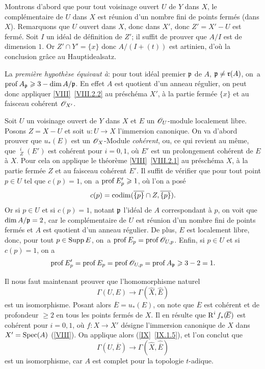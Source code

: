 Montrons d'abord que pour tout voisinage ouvert $U$ de $Y$ dans $X$, le compl\'ementaire de $U$ dans $X$ est r\'eunion d'un nombre fini de points ferm\'es (dans $X$). Remarquons que $U$ ouvert dans $X$, donc dans $X'$, donc $Z'=X'-U$ est ferm\'e. Soit $I$ un id\'eal de d\'efinition de $Z'$; il suffit de prouver que $A/I$ est de dimension $1$. Or $Z'\cap Y'=\{x\}$ donc $A/(I+(t))$ est artinien, d'o\`u la conclusion gr\^ace au \og Hauptidealsatz\fg.

La \emph{première hypothèse équivaut à}: \og pour tout id\'eal premier $\mathfrak{p}$ de $A$, $\mathfrak{p}\neq \mathfrak{r}(A)$, on~a $\operatorname{prof} A_{\mathfrak{p}}\geqslant3-\dim A/\mathfrak{p}$\fg. En effet $A$ est quotient d'un anneau r\'egulier, on peut donc appliquer \ref{VIII}~\ref{VIII.2.2} au pr\'esch\'ema $X'$, \`a la partie ferm\'ee $\{x\}$ et au faisceau coh\'erent ${\mathscr O}_{X'}$.

Soit $U$ un voisinage ouvert de $Y$ dans $X$ et $E$ un ${\mathscr O}_U$-module localement libre. Posons $Z=X-U$ et soit $u\colon U\to X$ l'immersion canonique. On va d'abord prouver que $u_\ast(E)$ est un $\mathscr{O}_X$-Module \emph{cohérent}, ou, ce qui revient au m\^eme, que $\mathop{\underline{\mathrm{H}}}\nolimits^i_Z(E')$ est coh\'erent pour $i=0, 1$, o\`u $E'$ est un prolongement coh\'erent de $E$ \`a $X$. Pour cela on applique le th\'eor\`eme \ref{VIII}~\ref{VIII.2.1} au pr\'esch\'ema $X$, \`a la partie ferm\'ee $Z$ et au faisceau coh\'erent $E'$. Il suffit de v\'erifier que pour tout point $p\in U$ tel que $c(p)=1$, on~a $\operatorname{prof} E'_p\geqslant 1$, o\`u l'on a pos\'e
\[
c(p)=\operatorname{codim} (\overline{\{p\}}\cap Z, \overline{\{p\}}).
\]
Or si $p\in U$ et si $c(p)=1$, notant $\mathfrak{p}$ l'id\'eal de $A$ correspondant \`a $p$, on voit que $\dim A/\mathfrak{p}=2$, car le compl\'ementaire de $U$ est r\'eunion d'un nombre fini de points ferm\'es et $A$ est quotient d'un anneau r\'egulier. De plus, $E$ est localement libre, donc, pour tout $p\in\operatorname{Supp} E$, on~a $\operatorname{prof} E_p=\operatorname{prof}{\mathscr O}_{U, p}$. Enfin, si $p\in U$ et si $c(p)=1$, on a
\[
\operatorname{prof} E'_p = \operatorname{prof} E_p = \operatorname{prof}{\mathscr O}_{U, p} = \operatorname{prof} A_{\mathfrak{p}} \geqslant 3-2=1.
\]

Il nous faut maintenant prouver que l'homomorphisme naturel
\begin{equation} \label{eq:X.1} {\Gamma(U, E) \to \Gamma(\hat{X}, \hat{E})}
\end{equation}
est un isomorphisme. Posant alors $\overline{\!E}=u_\ast(E)$, on note que $\overline{\!E}$ est coh\'erent et de profondeur $\geq 2$ en tous les points ferm\'es de $X$. Il en r\'esulte que $\operatorname{R}^i f_\ast(\overline{\!E})$ est coh\'erent pour $i=0, 1$, o\`u $f\colon X\to X'$ d\'esigne l'immersion canonique de $X$ dans $X'=\operatorname{Spec}(A)$ (\Exp \ref{VIII}). On applique alors (\ref{IX}~\ref{IX.1.5}), et l'on conclut que
\begin{equation} \label{eq:X.2}
\Gamma(U, \overline{\!E}) \to \Gamma(\hat{X}, \widehat{\overline{\!E}})
\end{equation}
est un isomorphisme, car $A$ est complet pour la topologie $t$-adique.

